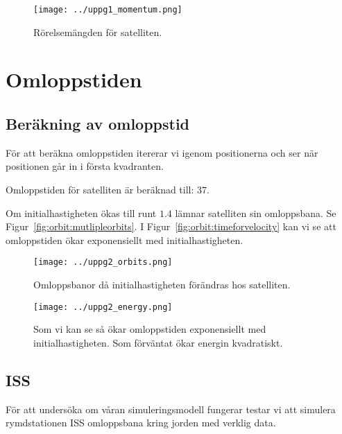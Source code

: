 \documentclass[a4]{article}
\begin{document}
\begin{figure}
\begin{center}
	\texttt{[image: ../uppg1\_momentum.png]}
\end{center}
\caption{Rörelsemängden för satelliten.}
\label{fig:satellite:linearmomentum}
\end{figure}


\section{Omloppstiden}
	\subsection{Beräkning av omloppstid}
För att beräkna omloppstiden itererar vi igenom positionerna och ser när
positionen går in i första kvadranten.

Omloppstiden för satelliten är beräknad till: $37$.

Om initialhastigheten ökas till runt $1.4$ lämnar satelliten sin omloppsbana.
Se Figur~\vref{fig:orbit:mutlipleorbits}.
I Figur~\vref{fig:orbit:timeforvelocity} kan vi se att omloppstiden ökar exponensiellt
med initialhastigheten.

\begin{figure}
\begin{center}
	\texttt{[image: ../uppg2\_orbits.png]}
\end{center}
\caption{
Omloppsbanor då initialhastigheten förändras hos satelliten.
}
\label{fig:orbit:mutlipleorbits}
\end{figure}

\begin{figure}
\begin{center}
	\texttt{[image: ../uppg2\_energy.png]}
\end{center}
\caption{
Som vi kan se så ökar omloppstiden exponensiellt med initialhastigheten.
Som förväntat ökar energin kvadratiskt.
}
\label{fig:orbit:timeforvelocity}
\end{figure}

	\subsection{ISS}
För att undersöka om våran simuleringsmodell fungerar testar vi att simulera
rymdstationen ISS omloppsbana kring jorden med verklig data.
\end{document}
